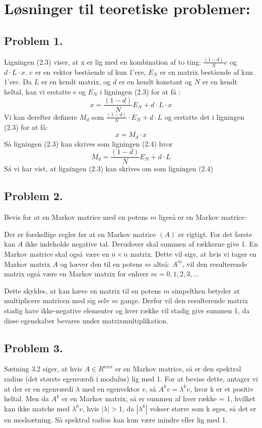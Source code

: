 
\section{Løsninger til teoretiske problemer:}


\subsection*{Problem 1.}

Ligningen (2.3) viser, at x er lig med en kombination af to ting: $\frac{(1-d)}{N}e$ og $d\cdot L\cdot x$. $e$ er en vektor bestående af kun 1'ere, $E_N$ er en matrix bestående af kun 1'ere.
Da $L$ er en kendt matrix, og $d$ er en kendt konstant og $N$ er en kendt heltal, kan vi erstatte e og $E_N$ i ligningen (2.3) for at få :
$$x = \frac{(1-d)}{N}E_N + d\cdot L\cdot x$$
Vi kan derefter definere $M_d$ som $\frac{(1-d)}{N} \cdot E_N + d \cdot L$ og erstatte det i ligningen (2.3) for at få:
$$x = M_d \cdot x$$
Så ligningen (2.3) kan skrives som ligningen (2.4) hvor $$M_d = \frac{(1-d)}{N}E_N + d \cdot L$$
Så vi har vist, at ligningen (2.3) kan skrives om som ligningen (2.4)



\subsection*{Problem 2.}

Bevis for at en Markov matrice med en potens $m$ ligeså er en Markov matrice:

Der er forskellige regler før at en Markov matrice $(A)$ er rigtigt. For det første kan $A$ ikke indeholde negative tal. Derudover skal summen af rækkerne give 1. En Markov matrice skal også være en $n \times n$ matrix. Dette vil sige, at hvis vi tager en Markov matrix $A$ og hæver den til en potens $m$ altså: $A^m$, vil den resulterende matrix også være en Markov matrix for enhver $m = 0,1,2,3,...$

Dette skyldes, at kan hæve en matrix til en potens $m$ simpelthen betyder at multiplicere matricen med sig selv $m$ gange. Derfor vil den resulterende matrix stadig have ikke-negative elementer og hver række vil stadig give summen 1, da disse egenskaber bevares under matrixmultiplikation.

\subsection*{Problem 3.}

Sætning 3.2 siger, at hvis $A \in R^{nxn}$ er en Markov matrice, så er den spektral radius (det største egenværdi i modulus) lig med 1. For at bevise dette, antager vi at der er en egenværdi $\lambda$ med en egenvektor $v$, så $A^kv = \lambda^kv$, hvor k er et positiv heltal. Men da $A^k$ er en Markov matrix, så er summen af hver række = 1, hvilket kan ikke matche med $\lambda^kv$, hvis $|\lambda| > 1$, da $|\lambda^k|$ vokser større som k øges, så det er en modsætning. Så spektral radius kan kun være mindre eller lig med 1.

